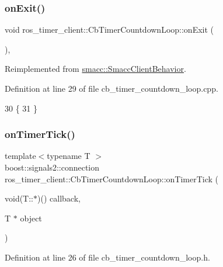 \subsubsection{\texorpdfstring{on\+Exit()}{onExit()}}
{\footnotesize\ttfamily void ros\+\_\+timer\+\_\+client\+::\+Cb\+Timer\+Countdown\+Loop\+::on\+Exit (\begin{DoxyParamCaption}{ }\end{DoxyParamCaption})\hspace{0.3cm}{\ttfamily [override]}, {\ttfamily [virtual]}}



Reimplemented from \hyperlink{classsmacc_1_1SmaccClientBehavior_ac0cd72d42bd00425362a97c9803ecce5}{smacc\+::\+Smacc\+Client\+Behavior}.



Definition at line 29 of file cb\+\_\+timer\+\_\+countdown\+\_\+loop.\+cpp.


\begin{DoxyCode}
30 \{
31 \}
\end{DoxyCode}
\mbox{\label{classros__timer__client_1_1CbTimerCountdownLoop_a7ebf87093607e9497f18eb0ded9fc1f9}} 
\subsubsection{\texorpdfstring{on\+Timer\+Tick()}{onTimerTick()}}
{\footnotesize\ttfamily template$<$typename T $>$ \\
boost\+::signals2\+::connection ros\+\_\+timer\+\_\+client\+::\+Cb\+Timer\+Countdown\+Loop\+::on\+Timer\+Tick (\begin{DoxyParamCaption}\item[{void(T\+::$\ast$)()}]{callback,  }\item[{T $\ast$}]{object }\end{DoxyParamCaption})\hspace{0.3cm}{\ttfamily [inline]}}



Definition at line 26 of file cb\+\_\+timer\+\_\+countdown\+\_\+loop.\+h.



